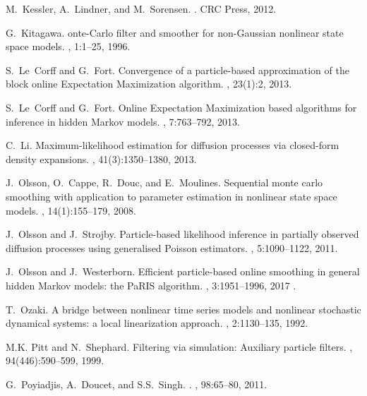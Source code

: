 \documentclass[12pt]{article}
\newcommand{\1}{\mathrm{1}}
\begin{document}
\begin{thebibliography}{10}
M.~Kessler, A.~Lindner, and M.~Sorensen.
.
\newblock CRC Press, 2012.

G.~Kitagawa.
onte-{C}arlo filter and smoother for non-{G}aussian nonlinear
  state space models.
, 1:1--25, 1996.

S.~Le~Corff and G.~Fort.
\newblock Convergence of a particle-based approximation of the block online
  {E}xpectation {M}aximization algorithm.
, 23(1):2,
  2013.

S.~Le~Corff and G.~Fort.
\newblock Online {E}xpectation {M}aximization based algorithms for inference in
  hidden {M}arkov models.
, 7:763--792, 2013.

C.~Li.
\newblock Maximum-likelihood estimation for diffusion processes via closed-form
  density expansions.
, 41(3):1350--1380, 2013.

J.~Olsson, O.~Cappe, R.~Douc, and E.~Moulines.
\newblock Sequential monte carlo smoothing with application to parameter
  estimation in nonlinear state space models.
, 14(1):155--179, 2008.

J.~Olsson and J.~Strojby.
\newblock Particle-based likelihood inference in partially observed diffusion
  processes using generalised {P}oisson estimators.
, 5:1090--1122, 2011.

J.~Olsson and J.~Westerborn.
\newblock Efficient particle-based online smoothing in general hidden {M}arkov
  models: the {PaRIS} algorithm.
, 3:1951--1996, 2017 .

T.~Ozaki.
\newblock A bridge between nonlinear time series models and nonlinear
  stochastic dynamical systems: a local linearization approach.
, 2:1130--135, 1992.

M.K. Pitt and N.~Shephard.
\newblock Filtering via simulation: Auxiliary particle filters.
, 94(446):590--599, 1999.

G.~Poyiadjis, A.~Doucet, and S.S.~Singh.
.
, 98:65--80, 2011.


\end{thebibliography}
\end{document}
